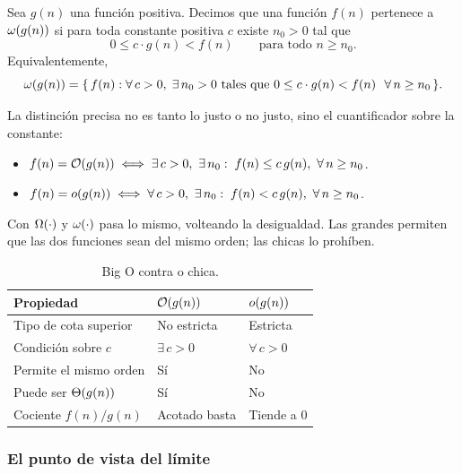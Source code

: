 \documentclass[11pt,letterpaper]{article}
\begin{document}
\begin{definicion}
  Sea $g(n)$ una función positiva. Decimos que una función $f(n)$
  pertenece a $\omega\!\left(g(n)\right)$ si para toda constante positiva $c$ existe
  $n_0 > 0$ tal que
  \[
    0 \leq c \cdot g(n) < f(n) \qquad \text{para todo } n \geq n_0 .
  \]
  Equivalentemente,
  \[
    \omega\!\left(g(n)\right) = \{\, f(n) : \forall\, c > 0,\; \exists\, n_0 > 0
    \ \text{tales que}\ 0 \leq c \cdot g(n) < f(n)
    \ \ \forall\, n \geq n_0 \,\}.
  \]
\end{definicion}

La distinción precisa no es tanto lo justo o no justo, sino el
cuantificador sobre la constante:

\begin{itemize}[itemsep=0.3em]
    \item $f(n) = \mathcal{O}\!\left(g(n)\right) \iff \exists\, c > 0,\ \exists\, n_0 :\;
          f(n) \leq c\,g(n),\ \forall\, n \geq n_0$.
    \item $f(n) = o\!\left(g(n)\right) \iff \forall\, c > 0,\ \exists\, n_0 :\;
          f(n) < c\,g(n),\ \forall\, n \geq n_0$.
\end{itemize}

Con $\Omega\!\left(\cdot\right)$ y $\omega\!\left(\cdot\right)$ pasa lo mismo, volteando la
desigualdad. Las grandes permiten que las dos funciones sean del
mismo orden; las chicas lo prohíben.

\begin{table}[htbp]
  \centering
  \small
  \begin{tabular}{lll}
    \toprule
    \textbf{Propiedad} & $\mathcal{O}\!\left(g(n)\right)$ & $o\!\left(g(n)\right)$ \\
    \midrule
    Tipo de cota superior      & No estricta & Estricta \\
    Condición sobre $c$        & $\exists\, c > 0$ & $\forall\, c > 0$ \\
    Permite el mismo orden     & Sí & No \\
    Puede ser $\Theta\!\left(g(n)\right)$     & Sí & No \\
    Cociente $f(n)/g(n)$       & Acotado basta & Tiende a $0$ \\
    \bottomrule
  \end{tabular}
  \caption{Big O contra o chica.}
  \label{tab:o-chica}
\end{table}

\subsubsection*{El punto de vista del límite}
\end{document}
